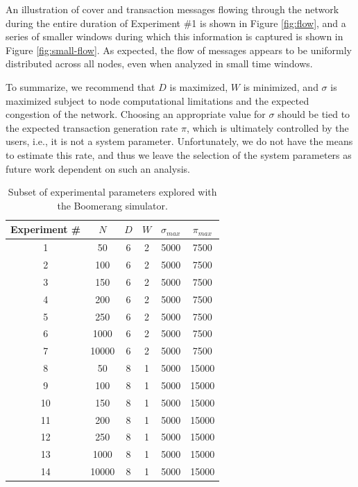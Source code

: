An illustration of cover and transaction messages flowing through the network during the entire duration of Experiment \#1 is shown in Figure \ref{fig:flow}, and a series of smaller windows during which this information is captured is shown in Figure \ref{fig:small-flow}. As expected, the flow of messages appears to be uniformly distributed across all nodes, even when analyzed in small time windows. 

To summarize, we recommend that $D$ is maximized, $W$ is minimized, and $\sigma$ is maximized subject to node computational limitations and the expected congestion of the network. Choosing an appropriate value for $\sigma$ should be tied to the expected transaction generation rate $\pi$, which is ultimately controlled by the users, i.e., it is not a system parameter. Unfortunately, we do not have the means to estimate this rate, and thus we leave the selection of the system parameters as future work dependent on such an analysis. 

\begin{table}
\begin{center}
\caption{Subset of experimental parameters explored with the Boomerang simulator.}
\label{tab:experiments}
    \begin{tabular}{|c|c|c|c|c|c|} \hline
    {\bf Experiment \#} & $N$ & $D$ & $W$ & $\sigma_{max}$ & $\pi_{max}$ \\ \hline
    1 & 50     & 6 & 2 & 5000 & 7500 \\ 
    2 & 100    & 6 & 2 & 5000 & 7500 \\ 
    3 & 150    & 6 & 2 & 5000 & 7500 \\ 
    4 & 200    & 6 & 2 & 5000 & 7500 \\ 
    5 & 250    & 6 & 2 & 5000 & 7500 \\ 
    6 & 1000   & 6 & 2 & 5000 & 7500 \\ 
    7 & 10000  & 6 & 2 & 5000 & 7500 \\ 
    8 & 50     & 8 & 1 & 5000 & 15000 \\ 
    9 & 100    & 8 & 1 & 5000 & 15000 \\ 
    10 & 150   & 8 & 1 & 5000 & 15000 \\ 
    11 & 200   & 8 & 1 & 5000 & 15000 \\ 
    12 & 250   & 8 & 1 & 5000 & 15000 \\ 
    13 & 1000  & 8 & 1 & 5000 & 15000 \\ 
    14 & 10000 & 8 & 1 & 5000 & 15000 \\ 
    \hline
    \end{tabular}
\end{center}
\end{table}

